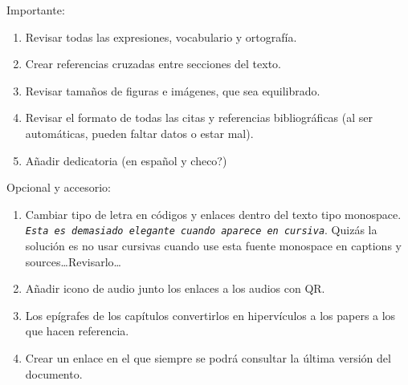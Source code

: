Importante:
  \begin{enumerate}
    \item Revisar todas las expresiones, vocabulario y ortografía.
    \item Crear referencias cruzadas entre secciones del texto.
    \item Revisar tamaños de figuras e imágenes, que sea equilibrado.
    \item Revisar el formato de todas las citas y referencias bibliográficas (al ser automáticas, pueden faltar datos o estar mal).
    \item Añadir dedicatoria (en español y checo?) %
  \end{enumerate}

  
  Opcional y accesorio:
  \begin{enumerate}
    \item Cambiar tipo de letra en códigos y enlaces dentro del texto tipo monospace. \texttt{\textit{Esta es demasiado elegante cuando aparece en cursiva}}. Quizás la solución es no usar cursivas cuando use esta fuente monospace en captions y sources\dots Revisarlo\dots
    \item Añadir icono de audio junto los enlaces a los audios con QR.
    \item Los epígrafes de los capítulos convertirlos en hipervículos a los papers a los que hacen referencia.
    \item Crear un enlace en el que siempre se podrá consultar la última versión del documento.
  \end{enumerate}



